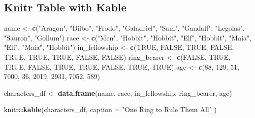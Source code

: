 \documentclass[
]{article}
\newenvironment{Shaded}{\begin{snugshade}}{\end{snugshade}}
\newcommand{\DataTypeTok}[1]{\textcolor[rgb]{0.13,0.29,0.53}{#1}}
\newcommand{\DecValTok}[1]{\textcolor[rgb]{0.00,0.00,0.81}{#1}}
\newcommand{\KeywordTok}[1]{\textcolor[rgb]{0.13,0.29,0.53}{\textbf{#1}}}
\newcommand{\NormalTok}[1]{#1}
\newcommand{\OperatorTok}[1]{\textcolor[rgb]{0.81,0.36,0.00}{\textbf{#1}}}
\newcommand{\OtherTok}[1]{\textcolor[rgb]{0.56,0.35,0.01}{#1}}
\newcommand{\StringTok}[1]{\textcolor[rgb]{0.31,0.60,0.02}{#1}}
\begin{document}
\hypertarget{knitr-table-with-kable}{%
\subsection{Knitr Table with Kable}\label{knitr-table-with-kable}}

\begin{Shaded}
\begin{Highlighting}[]
\NormalTok{name <-}\StringTok{ }\KeywordTok{c}\NormalTok{(}\StringTok{"Aragon"}\NormalTok{, }\StringTok{"Bilbo"}\NormalTok{, }\StringTok{"Frodo"}\NormalTok{, }\StringTok{"Galadriel"}\NormalTok{, }\StringTok{"Sam"}\NormalTok{, }\StringTok{"Gandalf"}\NormalTok{, }\StringTok{"Legolas"}\NormalTok{, }\StringTok{"Sauron"}\NormalTok{, }\StringTok{"Gollum"}\NormalTok{)}
\NormalTok{race <-}\StringTok{ }\KeywordTok{c}\NormalTok{(}\StringTok{"Men"}\NormalTok{, }\StringTok{"Hobbit"}\NormalTok{, }\StringTok{"Hobbit"}\NormalTok{, }\StringTok{"Elf"}\NormalTok{, }\StringTok{"Hobbit"}\NormalTok{, }\StringTok{"Maia"}\NormalTok{, }\StringTok{"Elf"}\NormalTok{, }\StringTok{"Maia"}\NormalTok{, }\StringTok{"Hobbit"}\NormalTok{)}
\NormalTok{in_fellowship <-}\StringTok{ }\KeywordTok{c}\NormalTok{(}\OtherTok{TRUE}\NormalTok{, }\OtherTok{FALSE}\NormalTok{, }\OtherTok{TRUE}\NormalTok{, }\OtherTok{FALSE}\NormalTok{, }\OtherTok{TRUE}\NormalTok{, }\OtherTok{TRUE}\NormalTok{, }\OtherTok{TRUE}\NormalTok{, }\OtherTok{FALSE}\NormalTok{, }\OtherTok{FALSE}\NormalTok{)}
\NormalTok{ring_bearer <-}\StringTok{ }\KeywordTok{c}\NormalTok{(}\OtherTok{FALSE}\NormalTok{, }\OtherTok{TRUE}\NormalTok{, }\OtherTok{TRUE}\NormalTok{, }\OtherTok{FALSE}\NormalTok{, }\OtherTok{TRUE}\NormalTok{, }\OtherTok{TRUE}\NormalTok{, }\OtherTok{FALSE}\NormalTok{, }\OtherTok{TRUE}\NormalTok{, }\OtherTok{TRUE}\NormalTok{)}
\NormalTok{age <-}\StringTok{ }\KeywordTok{c}\NormalTok{(}\DecValTok{88}\NormalTok{, }\DecValTok{129}\NormalTok{, }\DecValTok{51}\NormalTok{, }\DecValTok{7000}\NormalTok{, }\DecValTok{36}\NormalTok{, }\DecValTok{2019}\NormalTok{, }\DecValTok{2931}\NormalTok{, }\DecValTok{7052}\NormalTok{, }\DecValTok{589}\NormalTok{)}

\NormalTok{characters_df <-}\StringTok{ }\KeywordTok{data.frame}\NormalTok{(name, race, in_fellowship, ring_bearer, age)}

\NormalTok{knitr}\OperatorTok{::}\KeywordTok{kable}\NormalTok{(characters_df, }\DataTypeTok{caption =} \StringTok{"One Ring to Rule Them All"}\NormalTok{ )}
\end{Highlighting}
\end{Shaded}
\end{document}
